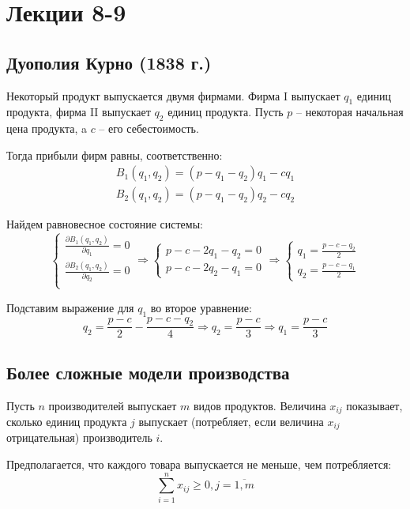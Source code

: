 \documentclass[12pt,a4paper,titlepage,oneside]{book}
\theoremstyle{definition}
\theoremstyle{plain}
\theoremstyle{remark}
\theoremstyle{remark}
\theoremstyle{plain}
\theoremstyle{plain}
\begin{document}
\chapter{Лекции 8-9}
\section{Дуополия Курно (1838 г.)}
Некоторый продукт выпускается двумя фирмами. Фирма I выпускает $q_1$ единиц продукта, фирма II выпускает $q_2$ единиц продукта. Пусть $p$ -- некоторая начальная цена продукта, a $c$ -- его себестоимость.

Тогда прибыли фирм равны, соответственно:
\begin{align*}
B_1(q_1,q_2)=(p-q_1-q_2)q_1-cq_1\\
B_2(q_1,q_2)=(p-q_1-q_2)q_2-cq_2
\end{align*}

Найдем равновесное состояние системы:
\begin{equation*}
\begin{cases}
\displaystyle \frac{\partial B_1(q_1,q_2)}{\partial q_1} = 0 \\[3ex]
\displaystyle \frac{\partial B_2(q_1,q_2)}{\partial q_2} = 0 \\
\end{cases} 
\Longrightarrow
\begin{cases}
p - c -2q_1 -q_2 = 0 \\
p - c- 2q_2 -q_1 = 0
\end{cases} 
\Longrightarrow
\begin{cases}
\displaystyle q_1=\frac{p-c-q_2}{2}\\[3ex]
\displaystyle q_2=\frac{p-c-q_1}{2}
\end{cases}
\end{equation*}

Подставим выражение для $q_1$ во второе уравнение:
$$q_2 = \frac{p - c}{2} - \frac{p-c-q_2}{4} \Rightarrow q_2 = \frac{p-c}{3} \Rightarrow q_1 = \frac{p-c}{3}$$

\section{Более сложные модели производства}
Пусть $n$ производителей выпускает $m$ видов продуктов. Величина $x_{ij}$ показывает, сколько единиц продукта $j$ выпускает (потребляет, если величина $x_{ij}$ отрицательная) производитель $i$.

Предполагается, что каждого товара выпускается не меньше, чем потребляется:
\begin{equation} \label{eq:eq5.1}
\sum_{i=1}^n x_{ij} \geqslant 0,j=\overline{1,m}
\end{equation}
\end{document}
